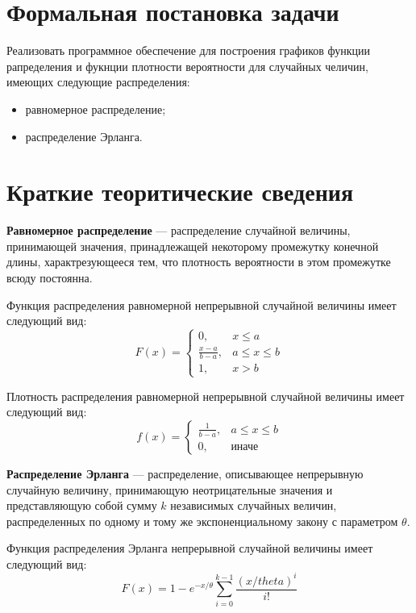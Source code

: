 \section*{Формальная постановка задачи}

Реализовать программное обеспечение для построения графиков функции рапределения и фукнции плотности вероятности для случайных челичин, имеющих следующие распределения:
\begin{itemize}
	\item равномерное распределение;
	\item распределение Эрланга.
\end{itemize}

\section*{Краткие теоритические сведения}

\textbf{Равномерное распределение} --- распределение случайной величины, принимающей значения, принадлежащей некоторому промежутку конечной длины, характрезующееся тем, что плотность вероятности в этом промежутке всюду постоянна.

Функция распределения равномерной непрерывной случайной величины имеет следующий вид: 
\begin{equation*}
	F(x) = \begin{cases}
		0, & x \leq a \\
		\frac{x-a}{b-a}, & a \leq x \leq b \\
		1, & x > b
	\end{cases}
\end{equation*}

Плотность распределения равномерной непрерывной случайной величины имеет следующий вид:
\begin{equation*}
	f(x) = \begin{cases}
		\frac{1}{b-a}, & a \leq x \leq b \\
		0, & \text{иначе}
	\end{cases}
\end{equation*}

\textbf{Распределение Эрланга} --- распределение, описывающее непрерывную случайную величину, принимающую неотрицательные значения и представляющую собой сумму $k$ независимых случайных величин, распределенных по одному и тому же экспоненциальному закону с параметром $\theta$.

Функция распределения Эрланга непрерывной случайной величины имеет следующий вид:
\begin{equation*}
	F(x) = 1 - e^{-x/\theta} \sum_{i=0}^{k-1} \frac{(x/theta)^i}{i!} 
\end{equation*}

